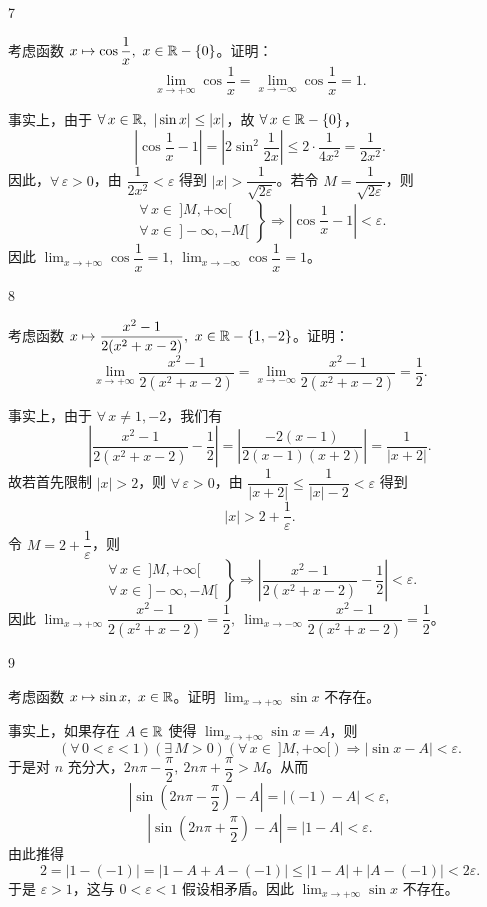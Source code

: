 \begin{sourceexample}{7}

	考虑函数 \(x\mapsto\cos\dfrac1x,\ x\in\R-\{0\}\)。证明：
	\[
	\lim_{x\to+\infty}\cos\frac1x=\lim_{x\to-\infty}\cos\frac1x=1.
	\]

	事实上，由于 \(\forall\,x\in\mathbb{R},\ |\sin x|\le|x|\)，故 \(\forall\,x\in\mathbb{R}-\{0\}\)，
	\[
	\left|\cos\frac1x-1\right|=\left|2\sin^2\frac1{2x}\right|\le2\cdot\frac1{4x^2}=\frac1{2x^2}.
	\]
	因此，\(\forall\,\varepsilon>0\)，由 \(\dfrac1{2x^2}<\varepsilon\) 得到 \(|x|>\dfrac1{\sqrt{2\varepsilon}}\)。若令 \(M=\dfrac1{\sqrt{2\varepsilon}}\)，则
	\[
	\left.\begin{array}{l} \forall\,x\in\ ]M,+\infty[ \\[2pt] \forall\,x\in\ ]-\infty,-M[ \end{array}\right\}\Longrightarrow \left|\cos\frac1x-1\right|<\varepsilon.
	\]
	因此 \(\lim_{x\to+\infty}\cos\dfrac1x=1,\ \lim_{x\to-\infty}\cos\dfrac1x=1\)。

\end{sourceexample}

\begin{sourceexample}{8}

	考虑函数 \(x\mapsto\dfrac{x^2-1}{2(x^2+x-2)},\ x\in\R-\{1,-2\}\)。证明：
	\[
	\lim_{x\to+\infty}\frac{x^2-1}{2(x^2+x-2)}=\lim_{x\to-\infty}\frac{x^2-1}{2(x^2+x-2)}=\frac12.
	\]

	事实上，由于 \(\forall\,x\neq1,-2\)，我们有
	\[
	\left|\frac{x^2-1}{2(x^2+x-2)}-\frac12\right|=\left|\frac{-2(x-1)}{2(x-1)(x+2)}\right|=\frac1{|x+2|}.
	\]
	故若首先限制 \(|x|>2\)，则 \(\forall\,\varepsilon>0\)，由 \(\dfrac1{|x+2|}\le\dfrac1{|x|-2}<\varepsilon\) 得到
	\[
	|x|>2+\frac1\varepsilon.
	\]
	令 \(M=2+\dfrac1\varepsilon\)，则
	\[
	\left.\begin{array}{l} \forall\,x\in\ ]M,+\infty[ \\[2pt] \forall\,x\in\ ]-\infty,-M[ \end{array}\right\}\Longrightarrow \left|\frac{x^2-1}{2(x^2+x-2)}-\frac12\right|<\varepsilon.
	\]
	因此 \(\lim_{x\to+\infty}\dfrac{x^2-1}{2(x^2+x-2)}=\dfrac12,\ \lim_{x\to-\infty}\dfrac{x^2-1}{2(x^2+x-2)}=\dfrac12\)。

\end{sourceexample}

\begin{sourceexample}{9}

	考虑函数 \(x\mapsto\sin x,\ x\in\R\)。证明 \(\lim_{x\to+\infty}\sin x\) 不存在。

	事实上，如果存在 \(A\in\mathbb{R}\) 使得 \(\lim_{x\to+\infty}\sin x=A\)，则
	\[
	(\forall\,0<\varepsilon<1)(\exists\,M>0)(\forall\,x\in\ ]M,+\infty[)\Longrightarrow|\sin x-A|<\varepsilon.
	\]
	于是对 \(n\) 充分大，\(2n\pi-\dfrac\pi2,\ 2n\pi+\dfrac\pi2>M\)。从而
	\[
	\left|\sin\left(2n\pi-\frac\pi2\right)-A\right|=|(-1)-A|<\varepsilon,
	\]
	\[
	\left|\sin\left(2n\pi+\frac\pi2\right)-A\right|=|1-A|<\varepsilon.
	\]
	由此推得
	\[
	2=|1-(-1)|=|1-A+A-(-1)|\le|1-A|+|A-(-1)|<2\varepsilon.
	\]
	于是 \(\varepsilon>1\)，这与 \(0<\varepsilon<1\) 假设相矛盾。因此 \(\lim_{x\to+\infty}\sin x\) 不存在。

\end{sourceexample}

